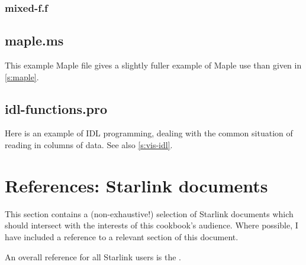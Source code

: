 \documentclass[11pt,oneside,chapters]{starlink}
\begin{document}


\subsection{mixed-f.f}



\section{maple.ms}
\label{a:maple}

This example Maple file gives a slightly fuller example
of Maple use than given in \ref{s:maple}.



\section{idl-functions.pro}
\label{a:idl}

Here is an example of IDL programming, dealing with the common
situation of reading in columns of data.  See also
\ref{s:vis-idl}.



\chapter{References: Starlink documents}
\label{s:refs}

This section contains a (non-exhaustive!) selection of Starlink
documents which should intersect with the interests of this cookbook's
audience.  Where possible, I have included a reference to a relevant
section of this document.

An overall reference for all Starlink users is the
.
\end{document}
